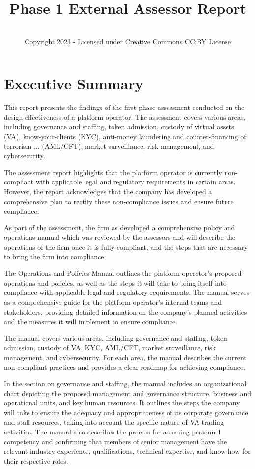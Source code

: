 \documentclass[]{report}
\title{Phase 1 External Assessor Report}
\author{\firmfullname\\Copyright 2023 - Licensed under Creative
  Commons CC:BY License}
\begin{document}
\maketitle

\chapter{Executive Summary}
This report presents the findings of the first-phase assessment
conducted on the design effectiveness of a platform operator. The
assessment covers various areas, including governance and staffing,
token admission, custody of virtual assets (VA), know-your-clients
(KYC), anti-money laundering and counter-financing of terrorism
... (AML/CFT), market surveillance, risk management, and
cybersecurity.

The assessment report highlights that the platform operator is
currently non-compliant with applicable legal and regulatory
requirements in certain areas. However, the report acknowledges that
the company has developed a comprehensive plan to rectify these
non-compliance issues and ensure future compliance.

As part of the assessment, the firm as developed a comprehensive
policy and operations manual which was reviewed by the assessors and
will describe the operations of the firm once it is fully compliant,
and the steps that are necessary to bring the firm into compliance.

The Operations and Policies Manual outlines the platform operator's
proposed operations and policies, as well as the steps it will take to
bring itself into compliance with applicable legal and regulatory
requirements. The manual serves as a comprehensive guide for the
platform operator's internal teams and stakeholders, providing
detailed information on the company's planned activities and the
measures it will implement to ensure compliance.

The manual covers various areas, including governance and staffing,
token admission, custody of VA, KYC, AML/CFT, market surveillance,
risk management, and cybersecurity. For each area, the manual
describes the current non-compliant practices and provides a clear
roadmap for achieving compliance.

In the section on governance and staffing, the manual includes an
organizational chart depicting the proposed management and governance
structure, business and operational units, and key human resources. It
outlines the steps the company will take to ensure the adequacy and
appropriateness of its corporate governance and staff resources,
taking into account the specific nature of VA trading activities. The
manual also describes the process for assessing personnel competency
and confirming that members of senior management have the relevant
industry experience, qualifications, technical expertise, and know-how
for their respective roles.
\end{document}
